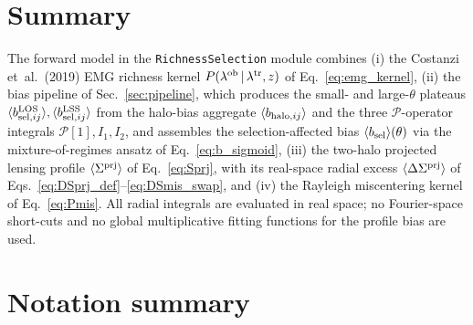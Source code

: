 \documentclass[a4paper, 11pt]{article}
\newcommand{\lob}{\lambda^{\rm ob}}
\newcommand{\ltr}{\lambda^{\rm tr}}
\newcommand{\Pop}{\mathcal{P}}
\newcommand{\bbsel}{\avg{b_{\rm sel}}}
\newcommand{\bbLOSij}{\avg{b_{{\rm sel},ij}^{\rm LOS}}}
\newcommand{\bbLSSij}{\avg{b_{{\rm sel},ij}^{\rm LSS}}}
\newcommand{\bbhaloij}{\avg{b_{{\rm halo},ij}}}
\newcommand{\Sprj}{\Sigma^{\rm prj}}
\newcommand{\DSprj}{\Delta\Sigma^{\rm prj}}
\newcommand{\avg}[1]{\langle #1 \rangle}
\begin{document}
\section{Summary}
\label{sec:summary}

The forward model in the \texttt{RichnessSelection} module combines
(i) the Costanzi et~al.\ (2019) EMG richness kernel
$P(\lob\,|\,\ltr,z)$ of Eq.~\eqref{eq:emg_kernel},
(ii) the bias pipeline of Sec.~\ref{sec:pipeline}, which produces the
small- and large-$\theta$ plateaus
$\bbLOSij,\bbLSSij$ from the halo-bias aggregate $\bbhaloij$ and the three
$\Pop$-operator integrals $\Pop[1],I_1,I_2$, and assembles the
selection-affected bias $\bbsel(\theta)$ via the mixture-of-regimes
ansatz of
Eq.~\eqref{eq:b_sigmoid},
(iii) the two-halo projected lensing profile $\avg{\Sprj}$ of
Eq.~\eqref{eq:Sprj}, with its real-space radial excess $\avg{\DSprj}$
of Eqs.~\eqref{eq:DSprj_def}--\eqref{eq:DSmis_swap}, and
(iv) the Rayleigh miscentering kernel of Eq.~\eqref{eq:Pmis}.
All radial integrals are evaluated in real space; no Fourier-space
short-cuts and no global multiplicative fitting functions for the
profile bias are used.

\appendix

\section{Notation summary}
\label{app:notation}
\end{document}
